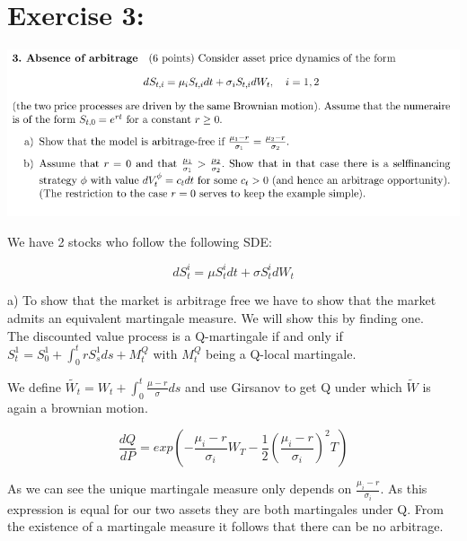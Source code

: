 \documentclass[document.tex]{subfiles}
\begin{document}
\section*{Exercise 3:}

\includegraphics[width=\textwidth]{ex3.png}


We have 2 stocks who follow the following SDE:

\begin{equation}
d S^i_t = \mu S^i_t dt + \sigma S^i_t d W_t
\end{equation}

a) To show that the market is arbitrage free we have to show that the market admits an equivalent martingale measure. We will show this by finding one. \\

The discounted value process is a Q-martingale if and only if $S^1_t = S^1_0 + \int_0^t rS^1_s ds + M^Q_t$ with $M^Q_t$ being a Q-local martingale.

We define $\tilde{W_t} = W_t + \int_0^t  \frac{\mu - r}{\sigma} ds$ and use Girsanov to get Q under which $\tilde{W}$ is again a brownian motion.

\begin{equation}
\frac{d Q}{d P} = exp(-\frac{\mu_i - r}{\sigma_i} W_T - \frac{1}{2} (\frac{\mu_i - r}{\sigma_i})^2 T)
\end{equation}

As we can see the unique martingale measure only depends on $\frac{\mu_i - r}{\sigma_i}$. As this expression is equal for our two assets they are both martingales under Q. From the existence of a martingale measure it follows that there can be no arbitrage.
\end{document}
